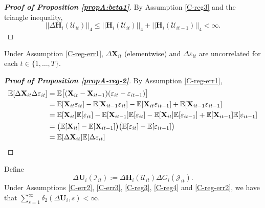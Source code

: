 \begin{proof}[\textnormal{\textbf{Proof of Proposition \ref{propA:beta1}}}]
By Assumption \ref{C-reg3} and the triangle inequality,
\[
 || \Delta \mathbf{H}_i(\mathcal{U}_{it})||_4 \leq  ||\mathbf{H}_i(\mathcal{U}_{it})||_4 +  || \mathbf{H}_i(\mathcal{U}_{it-1})||_4 < \infty.
\]
\end{proof} 

 \begin{propA}\label{propA-reg-2}
Under Assumption \ref{C-reg-err1}, $\Delta \mathbf{X}_{it}$ (elementwise) and $\Delta \varepsilon_{it}$ are uncorrelated for each $t\in \{1, \ldots, T\}$.
\end{propA}

\begin{proof}[\textnormal{\textbf{Proof of Proposition \ref{propA-reg-2}}}]
By Assumption \ref{C-reg-err1},
\begin{align*}
\mathbb{E} [\Delta \mathbf{X}_{it}\Delta \varepsilon_{it}] &= \mathbb{E} \big[(\mathbf{X}_{it} - \mathbf{X}_{it-1}) (\varepsilon_{it} - \varepsilon_{it-1})\big] \\
&=\mathbb{E}[\mathbf{X}_{it}  \varepsilon_{it}] - \mathbb{E}[\mathbf{X}_{it-1}  \varepsilon_{it}]- \mathbb{E}[\mathbf{X}_{it}  \varepsilon_{it-1}] + \mathbb{E}[\mathbf{X}_{it-1}  \varepsilon_{it-1}] \\
&= \mathbb{E}[\mathbf{X}_{it}]\mathbb{E}[  \varepsilon_{it}] - \mathbb{E}[\mathbf{X}_{it-1}]\mathbb{E}[  \varepsilon_{it}]- \mathbb{E}[\mathbf{X}_{it}]\mathbb{E}[  \varepsilon_{it-1}] + \mathbb{E}[\mathbf{X}_{it-1}]\mathbb{E}[  \varepsilon_{it-1}] \\
&= \big( \mathbb{E}[\mathbf{X}_{it}] - \mathbb{E}[\mathbf{X}_{it-1}]\big)\big(\mathbb{E}[  \varepsilon_{it}]  - \mathbb{E}[\varepsilon_{it-1}]\big) \\
&= \mathbb{E} [\Delta \mathbf{X}_{it}]\mathbb{E}[\Delta \varepsilon_{it}]
\end{align*}
\end{proof} 


\begin{propA}\label{propA-reg-3}
Define 
\[ \Delta \mathbf{U}_i(\mathcal{I}_{it}) := \Delta \mathbf{H}_i(\mathcal{U}_{it}) \Delta G_i(\mathcal{J}_{it}).
\]
Under Assumptions \ref{C-err2}, \ref{C-err3}, \ref{C-reg3}, \ref{C-reg4} and \ref{C-reg-err2}, we have that \linebreak $\sum_{s=1}^\infty \delta_2(\Delta \mathbf{U}_i, s) < \infty$.
\end{propA}

